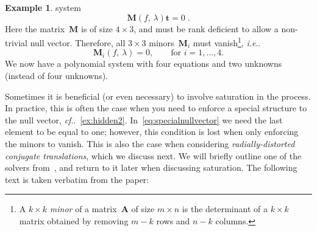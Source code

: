 \documentclass[11pt,a4paper]{article}
\makeatletter
\theoremstyle{definition}
\newtheorem{example}{Example}
\newcommand{\te}[1]{\text{#1}}
\newcommand{\mat}[1]{\bm{#1}}
\DeclareRobustCommand\ie{\emph{i.e}\@ifnextchar.{}{.\@}}
\DeclareRobustCommand\cf{\emph{cf}\@ifnextchar.{}{.\@}}
\makeatother
\begin{document}
\begin{example}
system
\begin{equation}
\mat{M}(f,\,\lambda)\mat{t} = 0\;.
\end{equation}
Here the matrix~$\mat{M}$ is of size $4\times 3$, and must be rank deficient to allow a non-trivial
null vector. Therefore, all $3\times 3$ minors~$\mat{M}_i$ must vanish\footnote{A
$k\times k$ \emph{minor} of a matrix~$\mat{A}$ of size $m\times n$ is the determinant of a $k\times k$ matrix obtained by removing $m-k$ rows and $n-k$ columns.}, \ie{}
\begin{equation}\label{eq:minors}
    \mat{M}_i(f,\,\lambda) = 0,  \qquad \te{for }i=1,\ldots, 4.
\end{equation}
We now have a polynomial system with four equations and two unknowns (instead of four unknowns).
\end{example}

Sometimes it is beneficial (or even necessary) to involve saturation in the process.
In practice, this is often the case when you need to enforce a special structure to the
null vector, \cf{}~\cref{ex:hidden2}. In~\cref{eq:specialnullvector} we need the last
element to be equal to one; however, this condition is lost when only enforcing the minors
to vanish.
This is also the case when considering \emph{radially-distorted conjugate translations},
which we discuss next. We will briefly outline one of the solvers from~\cite{pritts2017},
and return to it later when discussing saturation. The following text is taken verbatim from the paper:
\end{document}
